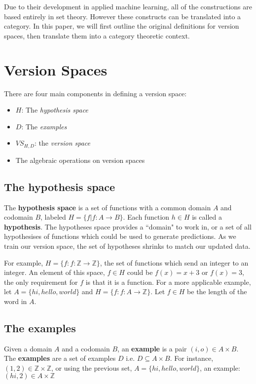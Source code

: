 \documentclass{article}
\theoremstyle{definition}
\begin{document}
Due to their development in applied machine learning, all of the constructions are based entirely in set theory. However these constructs can be translated into a category. In this paper, we will first outline the original definitions for version spaces, then translate them into a category theoretic context. 

\section{Version Spaces}
There are four main components in defining a version space: 
\begin{itemize}
    \item $H$: The \textit{hypothesis space}
    \item $D$: The \textit{examples}
    \item $VS_{H,D}$: the \textit{version space}
    \item The algebraic operations on version spaces
\end{itemize}


\subsection{The hypothesis space}

The \textbf{hypothesis space} is a set of functions with a common domain $A$ and codomain $B$, labeled $H = \{f | f: A \rightarrow B \}$. Each function $h \in H$ is called a \textbf{hypothesis}.  The hypotheses space provides a ``domain" to work in, or a set of all hypothesises of functions which could be used to generate predictions. As we train our version space, the set of hypotheses shrinks to match our updated data. 

For example, $H = \{f: f: \mathbb{Z} \rightarrow \mathbb{Z}\}$, the set of functions which send an integer to an integer. An element of this space, $f\in H$ could be $f(x) = x + 3$ or $f(x) = 3$, the only requirement for $f$ is that it is a function. For a more applicable example, let $A = \{hi, hello, world\}$ and $H = \{f: f: A\rightarrow \mathbb{Z}\}$. Let $f\in H$ be the length of the word in $A$. 

\subsection{The examples}
Given a domain $A$ and a codomain $B$, an \textbf{example} is a pair $(i, o)\in A \times B$. The \textbf{examples} are a set of examples $D$ i.e. $D \subseteq A \times B$. For instance, $(1,2) \in \mathbb{Z} \times \mathbb{Z}$, or using the previous set, $A = \{hi, hello, world\}$, an example: $(hi, 2) \in A \times \mathbb{Z}$
\end{document}
